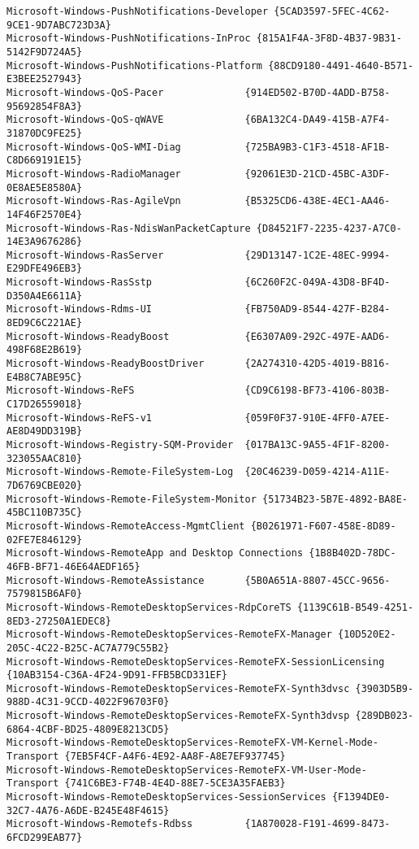 \documentclass{report}
\begin{document}
\begin{lstlisting}[breaklines=true,basicstyle=\tiny]
Microsoft-Windows-PushNotifications-Developer {5CAD3597-5FEC-4C62-9CE1-9D7ABC723D3A}
Microsoft-Windows-PushNotifications-InProc {815A1F4A-3F8D-4B37-9B31-5142F9D724A5}
Microsoft-Windows-PushNotifications-Platform {88CD9180-4491-4640-B571-E3BEE2527943}
Microsoft-Windows-QoS-Pacer              {914ED502-B70D-4ADD-B758-95692854F8A3}
Microsoft-Windows-QoS-qWAVE              {6BA132C4-DA49-415B-A7F4-31870DC9FE25}
Microsoft-Windows-QoS-WMI-Diag           {725BA9B3-C1F3-4518-AF1B-C8D669191E15}
Microsoft-Windows-RadioManager           {92061E3D-21CD-45BC-A3DF-0E8AE5E8580A}
Microsoft-Windows-Ras-AgileVpn           {B5325CD6-438E-4EC1-AA46-14F46F2570E4}
Microsoft-Windows-Ras-NdisWanPacketCapture {D84521F7-2235-4237-A7C0-14E3A9676286}
Microsoft-Windows-RasServer              {29D13147-1C2E-48EC-9994-E29DFE496EB3}
Microsoft-Windows-RasSstp                {6C260F2C-049A-43D8-BF4D-D350A4E6611A}
Microsoft-Windows-Rdms-UI                {FB750AD9-8544-427F-B284-8ED9C6C221AE}
Microsoft-Windows-ReadyBoost             {E6307A09-292C-497E-AAD6-498F68E2B619}
Microsoft-Windows-ReadyBoostDriver       {2A274310-42D5-4019-B816-E4B8C7ABE95C}
Microsoft-Windows-ReFS                   {CD9C6198-BF73-4106-803B-C17D26559018}
Microsoft-Windows-ReFS-v1                {059F0F37-910E-4FF0-A7EE-AE8D49DD319B}
Microsoft-Windows-Registry-SQM-Provider  {017BA13C-9A55-4F1F-8200-323055AAC810}
Microsoft-Windows-Remote-FileSystem-Log  {20C46239-D059-4214-A11E-7D6769CBE020}
Microsoft-Windows-Remote-FileSystem-Monitor {51734B23-5B7E-4892-BA8E-45BC110B735C}
Microsoft-Windows-RemoteAccess-MgmtClient {B0261971-F607-458E-8D89-02FE7E846129}
Microsoft-Windows-RemoteApp and Desktop Connections {1B8B402D-78DC-46FB-BF71-46E64AEDF165}
Microsoft-Windows-RemoteAssistance       {5B0A651A-8807-45CC-9656-7579815B6AF0}
Microsoft-Windows-RemoteDesktopServices-RdpCoreTS {1139C61B-B549-4251-8ED3-27250A1EDEC8}
Microsoft-Windows-RemoteDesktopServices-RemoteFX-Manager {10D520E2-205C-4C22-B25C-AC7A779C55B2}
Microsoft-Windows-RemoteDesktopServices-RemoteFX-SessionLicensing {10AB3154-C36A-4F24-9D91-FFB5BCD331EF}
Microsoft-Windows-RemoteDesktopServices-RemoteFX-Synth3dvsc {3903D5B9-988D-4C31-9CCD-4022F96703F0}
Microsoft-Windows-RemoteDesktopServices-RemoteFX-Synth3dvsp {289DB023-6864-4CBF-BD25-4809E8213CD5}
Microsoft-Windows-RemoteDesktopServices-RemoteFX-VM-Kernel-Mode-Transport {7EB5F4CF-A4F6-4E92-AA8F-A8E7EF937745}
Microsoft-Windows-RemoteDesktopServices-RemoteFX-VM-User-Mode-Transport {741C6BE3-F74B-4E4D-88E7-5CE3A35FAEB3}
Microsoft-Windows-RemoteDesktopServices-SessionServices {F1394DE0-32C7-4A76-A6DE-B245E48F4615}
Microsoft-Windows-Remotefs-Rdbss         {1A870028-F191-4699-8473-6FCD299EAB77}

\end{lstlisting}
\end{document}
